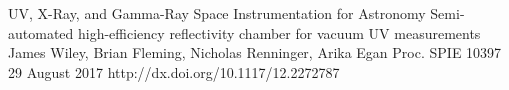  
 
 
 \begin{cventries}
 
    \cvpublicationentry
     {UV, X-Ray, and Gamma-Ray Space Instrumentation for Astronomy} %
     {Semi-automated high-efficiency reflectivity chamber for vacuum UV measurements} %
     {James Wiley, Brian Fleming, Nicholas Renninger, Arika Egan} %
     {Proc. SPIE 10397}
     {29 August 2017}
     {http://dx.doi.org/10.1117/12.2272787}
 \end{cventries}
 
 
